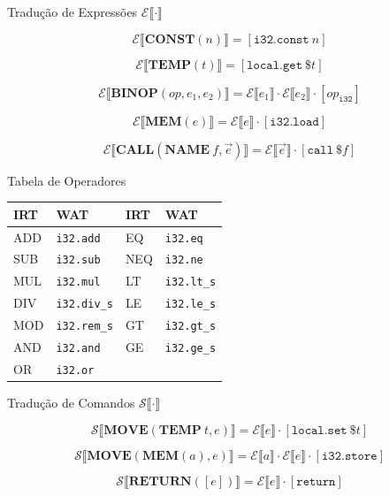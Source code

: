 \begin{frame}{Tradução de Expressões
    \(\mathcal{E}\llbracket \cdot \rrbracket\)}

    \[\mathcal{E}\llbracket \mathbf{CONST}(n) \rrbracket = [\mathtt{i32.const}\ n]\]

    \[\mathcal{E}\llbracket \mathbf{TEMP}(t) \rrbracket = [\mathtt{local.get}\ \$t]\]

    \[\mathcal{E}\llbracket \mathbf{BINOP}(\mathit{op}, e_1, e_2) \rrbracket = \mathcal{E}\llbracket e_1 \rrbracket \cdot \mathcal{E}\llbracket e_2 \rrbracket \cdot [\mathit{op}_\mathtt{i32}]\]

    \[\mathcal{E}\llbracket \mathbf{MEM}(e) \rrbracket = \mathcal{E}\llbracket e \rrbracket \cdot [\mathtt{i32.load}]\]

    \[\mathcal{E}\llbracket \mathbf{CALL}(\mathbf{NAME}\ f, \vec{e}) \rrbracket = \mathcal{E}\llbracket \vec{e} \rrbracket \cdot [\mathtt{call}\ \$f]\]
\end{frame}

\begin{frame}[fragile]{Tabela de Operadores}

    \begin{table}
        \begin{tabular}{l l l l}
            \hline
            IRT & WAT & IRT & WAT \\
            \hline
            ADD & \texttt{i32.add} & EQ &
            \texttt{i32.eq} \\
            SUB & \texttt{i32.sub} & NEQ &
            \texttt{i32.ne} \\
            MUL & \texttt{i32.mul} & LT &
            \texttt{i32.lt\_s} \\
            DIV & \texttt{i32.div\_s} & LE &
            \texttt{i32.le\_s} \\
            MOD & \texttt{i32.rem\_s} & GT &
            \texttt{i32.gt\_s} \\
            AND & \texttt{i32.and} & GE &
            \texttt{i32.ge\_s} \\
            OR & \texttt{i32.or} & & \\
            \hline
        \end{tabular}
    \end{table}
\end{frame}

\begin{frame}{Tradução de Comandos
    \(\mathcal{S}\llbracket \cdot \rrbracket\)}

    \[\mathcal{S}\llbracket \mathbf{MOVE}(\mathbf{TEMP}\ t, e) \rrbracket = \mathcal{E}\llbracket e \rrbracket \cdot [\mathtt{local.set}\ \$t]\]

    \[\mathcal{S}\llbracket \mathbf{MOVE}(\mathbf{MEM}(a), e) \rrbracket = \mathcal{E}\llbracket a \rrbracket \cdot \mathcal{E}\llbracket e \rrbracket \cdot [\mathtt{i32.store}]\]

    \[\mathcal{S}\llbracket \mathbf{RETURN}([e]) \rrbracket = \mathcal{E}\llbracket e \rrbracket \cdot [\mathtt{return}]\]
\end{frame}

